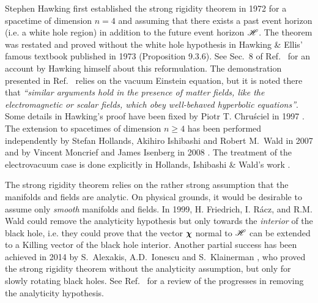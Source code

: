 \begin{hist}
Stephen Hawking first established the strong rigidity
theorem in 1972 \cite{Hawki72}
for a spacetime of dimension $n=4$ and assuming that there exists
a past event horizon (i.e. a white hole region) in addition to the
future event horizon $\mathscr{H}$.
The theorem was restated and proved without the white hole hypothesis
in Hawking \& Ellis' famous textbook published in 1973 \cite{HawkiE73}
(Proposition 9.3.6). See Sec.~8 of Ref.~\cite{Hawki73} for an account by Hawking himself
about this reformulation. The demonstration presented in Ref.~\cite{HawkiE73}
relies on the vacuum Einstein equation,
but it is noted there that \emph{``similar arguments hold in the presence
of matter fields, like the electromagnetic or scalar fields, which obey
well-behaved hyperbolic equations''}.
Some details in Hawking's proof have been fixed
by Piotr T. Chru\'sciel in 1997 \cite{Chrus97}.
The extension to spacetimes of
dimension $n\geq 4$ has been performed independently by
Stefan Hollands, Akihiro Ishibashi
and Robert M.~Wald in 2007 \cite{HollaIW07}
and by Vincent Moncrief and James Isenberg
in 2008 \cite{MoncrI08}. The treatment of the electrovacuum
case is done explicitly in Hollands, Ishibashi \& Wald's work \cite{HollaIW07}.
\end{hist}

The strong rigidity theorem relies on the rather strong assumption that
the manifolds and fields are analytic.
On physical grounds,
it would be desirable to assume only \emph{smooth} manifolds and fields.
In 1999, H. Friedrich, I. Rácz,
and R.M. Wald \cite{FriedRW99} could remove the analyticity hypothesis but only
towards the \emph{interior} of the black hole, i.e. they could prove that
the vector $\bm{\chi}$ normal to $\mathscr{H}$ can be extended to a Killing vector
of the black hole interior.
Another partial success has been achieved in 2014 by
S.~Alexakis, A.D.~Ionescu and
S.~Klainerman \cite{AlexaIK14}, who proved
the strong rigidity theorem without the analyticity
assumption, but only for slowly rotating black holes.
See Ref.~\cite{IonesK15} for a review of the progresses in removing
the analyticity hypothesis.

